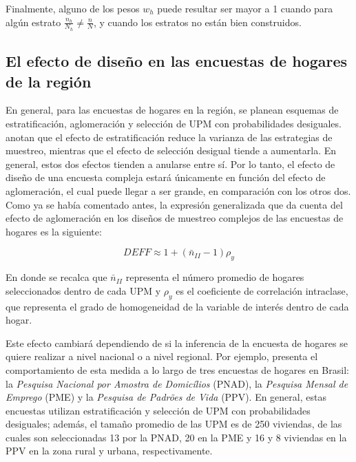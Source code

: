 \documentclass[
  12pt,
  spanish,
]{book}
\begin{document}
Finalmente, alguno de los pesos \(w_h\) puede resultar ser mayor a 1 cuando para algún estrato \(\frac{n_h}{N_h}\neq\frac{n}{N}\), y cuando los estratos no están bien construidos.

\hypertarget{el-efecto-de-diseuxf1o-en-las-encuestas-de-hogares-de-la-regiuxf3n}{%
\subsection{El efecto de diseño en las encuestas de hogares de la región}\label{el-efecto-de-diseuxf1o-en-las-encuestas-de-hogares-de-la-regiuxf3n}}

En general, para las encuestas de hogares en la región, se planean esquemas de estratificación, aglomeración y selección de UPM con probabilidades desiguales. \citet{Heeringa_West_Berglund_2017} anotan que el efecto de estratificación reduce la varianza de las estrategias de muestreo, mientras que el efecto de selección desigual tiende a aumentarla. En general, estos dos efectos tienden a anularse entre sí. Por lo tanto, el efecto de diseño de una encuesta compleja estará únicamente en función del efecto de aglomeración, el cual puede llegar a ser grande, en comparación con los otros dos. Como ya se había comentado antes, la expresión generalizada que da cuenta del efecto de aglomeración en los diseños de muestreo complejos de las encuestas de hogares es la siguiente:

\[
DEFF \approx 1 + (\bar{n}_{II} - 1)\rho_y
\]

En donde se recalca que \(\bar{n}_{II}\) representa el número promedio de hogares seleccionados dentro de cada UPM y \(\rho_y\) es el coeficiente de correlación intraclase, que representa el grado de homogeneidad de la variable de interés dentro de cada hogar.

Este efecto cambiará dependiendo de si la inferencia de la encuesta de hogares se quiere realizar a nivel nacional o a nivel regional. Por ejemplo, \citet[capítulo 7]{United_Nations_2005} presenta el comportamiento de esta medida a lo largo de tres encuestas de hogares en Brasil: la \emph{Pesquisa Nacional por Amostra de Domicílios} (PNAD), la \emph{Pesquisa Mensal de Emprego} (PME) y la \emph{Pesquisa de Padrões de Vida} (PPV). En general, estas encuestas utilizan estratificación y selección de UPM con probabilidades desiguales; además, el tamaño promedio de las UPM es de 250 viviendas, de las cuales son seleccionadas 13 por la PNAD, 20 en la PME y 16 y 8 viviendas en la PPV en la zona rural y urbana, respectivamente.
\end{document}
